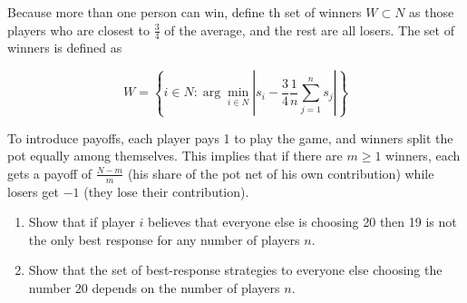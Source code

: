 \documentclass[12pt,a4paper]{article}
\begin{document}
Because more than one person can win, define th set of winners $W \subset N$ as those players who are closest to $\frac{3}{4}$ of the average, and the rest are all losers. The set of winners is defined as

\[
  W=\left\{i \in N:\arg\min_{i \in N} \left|s_i - \frac{3}{4}\frac{1}{n}\sum_{j=1}^n s_j\right|\right\}
\]

To introduce payoffs, each player pays 1 to play the game, and winners split the pot equally among themselves. This implies that if there are $m \ge 1$ winners, each gets a payoff of $\frac{N-m}{m}$ (his share of the pot net of his own contribution) while losers get $-1$ (they lose their contribution).

\begin{enumerate}[label=(\alph*)]
  \item Show that if player $i$ believes that everyone else is choosing 20 then 19 is not the only best response for any number of players $n$.
  \item Show that the set of best-response strategies to everyone else choosing the number $20$ depends on the number of players $n$.
\end{enumerate}

\vspace{0.5cm}
\end{document}

